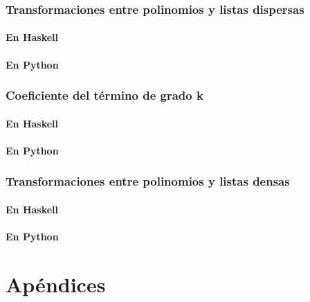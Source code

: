 \documentclass[a4paper,12pt,twoside]{book}
\begin{document}
\section{Transformaciones entre polinomios y listas dispersas}
\subsection{En Haskell}
\subsection{En Python}

\section{Coeficiente del término de grado k}
\subsection{En Haskell}
\subsection{En Python}

\section{Transformaciones entre polinomios y listas densas}
\subsection{En Haskell}
\subsection{En Python}

\part*{Apéndices}
\appendix

% 



\end{document}
